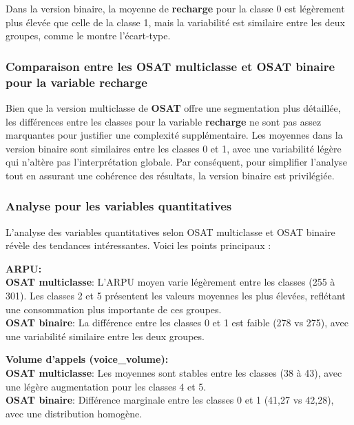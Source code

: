 Dans la version binaire, la moyenne de \textbf{recharge} pour la classe 0 est légèrement plus élevée que celle de la classe 1, mais la variabilité est similaire entre les deux groupes, comme le montre l'écart-type.

\subsubsection*{Comparaison entre les OSAT multiclasse et OSAT binaire pour la variable recharge} 
Bien que la version multiclasse de \textbf{OSAT} offre une segmentation plus détaillée, les différences entre les classes pour la variable \textbf{recharge} ne sont pas assez marquantes pour justifier une complexité supplémentaire. Les moyennes dans la version binaire sont similaires entre les classes 0 et 1, avec une variabilité légère qui n'altère pas l'interprétation globale. Par conséquent, pour simplifier l'analyse tout en assurant une cohérence des résultats, la version binaire est privilégiée.

\subsubsection*{Analyse pour les variables quantitatives}

L'analyse des variables quantitatives selon OSAT multiclasse et OSAT binaire révèle des tendances intéressantes. Voici les points principaux :

\noindent \textbf{ARPU:} \\
\textbf{OSAT multiclasse}: L'ARPU moyen varie légèrement entre les classes (255 à 301). Les classes 2 et 5 présentent les valeurs moyennes les plus élevées, reflétant une consommation plus importante de ces groupes. \\
\textbf{OSAT binaire}: La différence entre les classes 0 et 1 est faible (278 vs 275), avec une variabilité similaire entre les deux groupes.

\vspace{0.2cm}

\noindent \textbf{Volume d'appels (voice\_volume):} \\
\textbf{OSAT multiclasse}: Les moyennes sont stables entre les classes (38 à 43), avec une légère augmentation pour les classes 4 et 5. \\
\textbf{OSAT binaire}: Différence marginale entre les classes 0 et 1 (41,27 vs 42,28), avec une distribution homogène.

\vspace{0.2cm}

